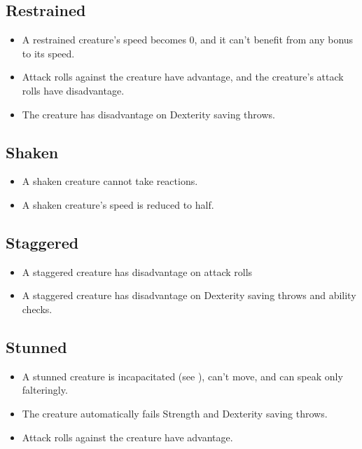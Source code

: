 \subsection{Restrained\label{condition:restrained}}
\begin{itemize}
\item A restrained creature's speed becomes 0, and it can't benefit from any bonus to its speed.
\item Attack rolls against the creature have advantage, and the creature's attack rolls have disadvantage.
\item The creature has disadvantage on Dexterity saving throws.
\end{itemize}

\subsection{Shaken\label{condition:shaken}}
\begin{itemize}
	\item A shaken creature cannot take reactions.
	\item A shaken creature's speed is reduced to half.
\end{itemize}

\subsection{Staggered\label{condition:staggered}}
\begin{itemize}
	\item A staggered creature has disadvantage on attack rolls 
	\item A staggered creature has disadvantage on Dexterity saving throws and ability checks.
\end{itemize}

\subsection{Stunned\label{condition:stunned}}
\begin{itemize}
\item A stunned creature is incapacitated (see ), can't move, and can speak only falteringly.
\item The creature automatically fails Strength and Dexterity saving throws.
\item Attack rolls against the creature have advantage.
\end{itemize}

